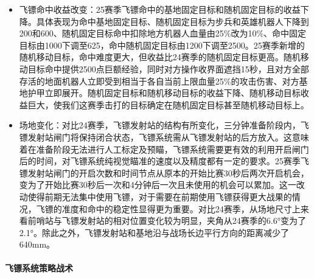     
            \begin{itemize}
                \item 飞镖命中收益改变：25赛季飞镖命中的基地固定目标和随机固定目标的收益下降。具体表现为命中基地固定目标、随机固定目标为步兵和英雄机器人下降到200和600、随机固定目标命中扣除地方机器人血量由25\%改为10\%、命中固定目标由1000下调至625，命中随机固定目标由1200下调至2500。25赛季新增的随机移动目标，命中难度更大，但收益比24赛季的随机固定目标更高。随机移动目标命中提供2500点巨额经验，同时对方操作收界面遮挡15秒，且对方全部存活的地面机器人立即受到相当于各自当前上限血量25\%的攻击伤害、对方基地护甲立即展开。随机固定目标和随机移动目标的收益下降、随机移动目标收益巨大，使我们这赛季击打的目标确定在随机固定目标甚至随机移动目标上。
                \item 场地变化：对比24赛季，飞镖发射站的结构有所变化，三分钟准备阶段内，飞镖发射站闸门将保持闭合状态，飞镖系统需从飞镖发射站的后方放入。这意味着在准备阶段无法进行人工标定及预瞄，飞镖系统需要更有效的利用开启闸门后的时间，对飞镖系统纯视觉瞄准的速度以及精度都有一定的要求。25赛季飞镖发射站闸门的开启次数和时间节点从原本的开始比赛30秒后两次开启机会，变为了开始比赛30秒后一次和4分钟后一次且未使用的机会可以累加。这一改动使得前期无法集中使用飞镖，对于需要在前期使用飞镖获得更大战果的情况，飞镖的准度和命中的稳定性显得更为重要。对比24赛季，从场地尺寸上来看前哨站与飞镖发射站的相对位置变化较为明显，夹角从24赛季的6.6°变为了2.1°。除此之外，飞镖发射站和基地沿与战场长边平行方向的距离减少了640mm。
            \end{itemize}

        \paragraph{飞镖系统策略战术}

    
